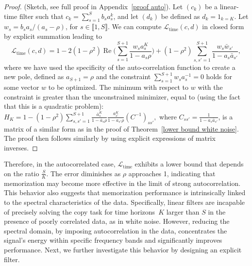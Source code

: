 \begin{proof}(Sketch, see full proof in Appendix~\ref{proof auto}).
Let \((c_k)\) be a linear-time filter such that \(c_k = \sum_{s=1}^S b_s a_s^k\), and let \((d_k)\) be defined as $d_k =  1_{k=K}$. Let $w_s = b_s a_s / ( a_s - \rho)$, for $s \in \llbracket 1,S \rrbracket$. We can compute $\mathcal{L}_\text{time}(c, d)$ in closed form by explicit summation leading to
\[
\mathcal{L}_\text{time}(c, d)=
1 - 2(1 - \rho^2)\operatorname{Re}\Big(\sum_{s=1}^{S+1}\frac{w_s a_s^K}{1-a_s\rho}\Big) + (1-\rho^2)\sum_{s,s'=1}^{S+1}\frac{w_s \bar{w}_{s'}}{1-a_s\bar{a}_{s'}},
\]
where we have used the specificity of the auto-correlation function to create a new pole, defined as \(a_{S+1} = \rho\) and the constraint \(\sum_{s=1}^{S+1} w_s a_s^{-1} = 0\) holds for some vector $w$ to be optimized. The minimum with respect to $w$ with the constraint is greater than the unconstrained minimizer, equal to (using the fact that this is a quadratic problem):
$ \displaystyle 
H_K = 1 - (1-\rho^2)\sum_{s, s'=1}^{S+1}\frac{\bar{a}_s^K}{1-\bar{a}_s\rho}\frac{a_{s'}^K}{1-a_{s'}\rho}(C^{-1})_{ss'},
$
where $C_{ss'} = \frac{1}{1-a_s\bar{a}_{s'}}$, is a matrix of a similar form as in the proof of Theorem~\ref{lower bound white noise}. The proof then follows similarly by using explicit expressions of matrix inverses.
\end{proof}

Therefore, in the autocorrelated case, $\mathcal{L}_\text{time}$ exhibits a lower bound that depends on the ratio \(\frac{S}{K}\). The error diminishes as \(\rho\) approaches 1, indicating that memorization may become more effective in the limit of strong autocorrelation. This behavior also suggests that memorization performance is intrinsically linked to the spectral characteristics of the data. Specifically, linear filters are incapable of precisely solving the copy task for time horizons~\(K\) larger than \(S\) in the presence of poorly correlated data, as in white noise. However, reducing the spectral domain, by imposing autocorrelation in the data, concentrates the signal's energy within specific frequency bands and significantly improves performance. Next, we further investigate this behavior by designing an explicit filter.

